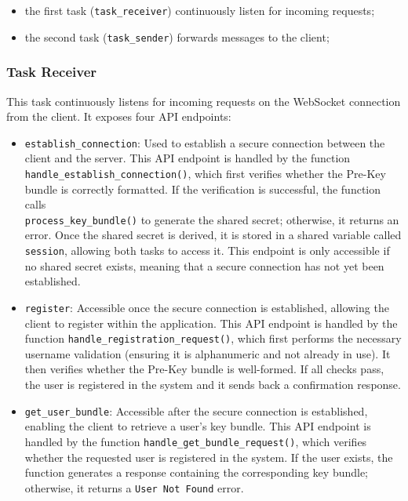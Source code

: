 \begin{itemize}
    \item the first task (\texttt{task\_receiver}) continuously listen for incoming requests;
    \item the second task (\texttt{task\_sender}) forwards messages to the client;
\end{itemize}

\subsubsection{Task Receiver}
\label{subsec:TaskReceiver}

This task continuously listens for incoming requests on the WebSocket connection from the client. It exposes four API endpoints:

\begin{itemize}
    \item \texttt{establish\_connection}: Used to establish a secure connection between the client and the server. This API endpoint is handled by the function \\
    \texttt{handle\_establish\_connection()}, which first verifies whether the Pre-Key bundle is correctly formatted. If the verification is successful, the function calls  \\
    \texttt{process\_key\_bundle()} to generate the shared secret; otherwise, it returns an error. Once the shared secret is derived, it is stored in a shared variable called \texttt{session}, allowing both tasks to access it. This endpoint is only accessible if no shared secret exists, meaning that a secure connection has not yet been established.

    \item \texttt{register}: Accessible once the secure connection is established, allowing the client to register within the application. This API endpoint is handled by the function \texttt{handle\_registration\_request()}, which first performs the necessary username validation (ensuring it is alphanumeric and not already in use). It then verifies whether the Pre-Key bundle is well-formed. If all checks pass, the user is registered in the system and it sends back a confirmation response.

    \item \texttt{get\_user\_bundle}: Accessible after the secure connection is established, enabling the client to retrieve a user's key bundle. This API endpoint is handled by the function \texttt{handle\_get\_bundle\_request()}, which verifies whether the requested user is registered in the system. If the user exists, the function generates a response containing the corresponding key bundle; otherwise, it returns a \texttt{User Not Found} error.


\end{itemize}
